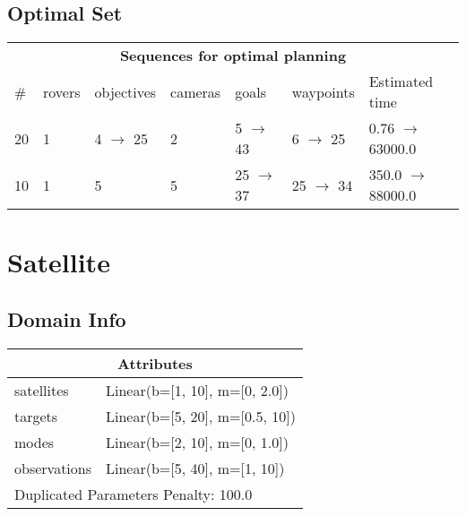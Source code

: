 \documentclass{article}
\begin{document}
                            \subsection*{Optimal Set}

                            \begin{center}
                            \begin{tabular}{l|l|l|l|l|l|l}
                            \multicolumn{7}{c}{\bf \large Sequences for optimal planning}\\
                            \# & rovers & objectives & cameras & goals & waypoints & Estimated time\\\midrule
                            20&1&4 $\rightarrow$ 25&2&5 $\rightarrow$ 43&6 $\rightarrow$ 25&0.76 $\rightarrow$ 63000.0\\
10&1&5&5&25 $\rightarrow$ 37&25 $\rightarrow$ 34&350.0 $\rightarrow$ 88000.0
                            \end{tabular}
                            \end{center}
                    \newpage \section{Satellite}
                    \subsection*{Domain Info}

                    \begin{center}
                    \begin{tabular}{p{}p{}}
                    \multicolumn{2}{c}{\bf \large Attributes}\\\midrule
                    satellites & Linear(b=[1, 10], m=[0, 2.0])\\
targets & Linear(b=[5, 20], m=[0.5, 10])\\
modes & Linear(b=[2, 10], m=[0, 1.0])\\
observations & Linear(b=[5, 40], m=[1, 10])
                    
                     \\\midrule
                    \multicolumn{2}{l}{Duplicated Parameters Penalty: 100.0}
                    \end{tabular}
                    \end{center}
                
\end{document}
